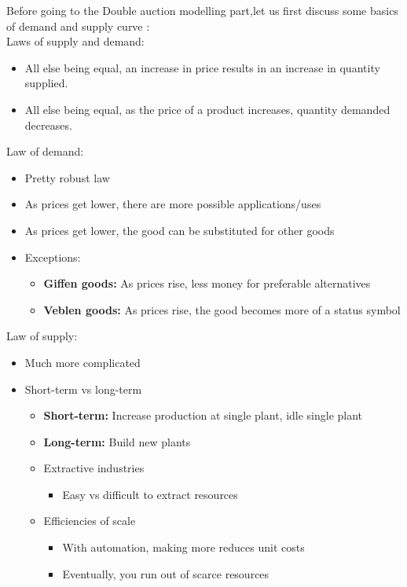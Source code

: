 \documentclass[10pt,a4paper,oneside]{report}
\begin{document}
Before going to the Double auction modelling part,let us first discuss some basics of demand and supply curve :\citep{gjerstad1998price}\\
\noindent Laws of supply and demand:
\begin{itemize}
\item All else being equal, an increase in price results in an increase in quantity supplied.
\item All else being equal, as the price of a product increases, quantity demanded decreases.
\end{itemize}
Law of demand:
\begin{itemize}
\item Pretty robust law
\item As prices get lower, there are more possible applications/uses
\item As prices get lower, the good can be substituted for other goods
\item Exceptions:
\begin{itemize}
\item \textbf{Giffen goods:} As prices rise, less money for preferable alternatives
\item \textbf{Veblen goods:} As prices rise, the good becomes more of a status symbol
\end{itemize}
\end{itemize}
Law of supply:
\begin{itemize}
\item Much more complicated
\item Short-term vs long-term
\begin{itemize}
\item \textbf{Short-term:} Increase production at single plant, idle single plant
\item \textbf{Long-term:} Build new plants
\end{itemize}
\begin{itemize}
\item Extractive industries
\begin{itemize}
\item Easy vs difficult to extract resources
\end{itemize}
\item Efficiencies of scale
\begin{itemize}
\item With automation, making more reduces unit costs
 \item Eventually, you run out of scarce resources
\end{itemize}
\end{itemize}
\end{itemize}
\end{document}
